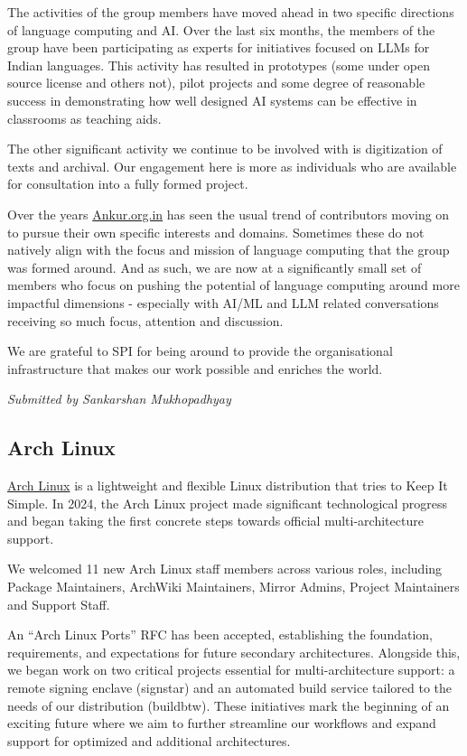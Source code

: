 \documentclass[a4paper]{report}
\begin{document}
The activities of the group members have moved ahead in two specific directions of language computing and AI. Over the last six months, the members of the group have been participating as experts for initiatives focused on LLMs for Indian languages. This activity has resulted in prototypes (some under open source license and others not), pilot projects and some degree of reasonable success in demonstrating how well designed AI systems can be effective in classrooms as teaching aids.

The other significant activity we continue to be involved with is digitization of texts and archival. Our engagement here is more as individuals who are available for consultation into a fully formed project.

Over the years \href{https://ankur.org.in/}{Ankur.org.in} has seen the usual trend of contributors moving on to pursue their own specific interests and domains. Sometimes these do not natively align with the focus and mission of language computing that the group was formed around. And as such, we are now at a significantly small set of members who focus on pushing the potential of language computing around more impactful dimensions - especially with AI/ML and LLM related conversations receiving so much focus, attention and discussion.

We are grateful to SPI for being around to provide the organisational infrastructure that makes our work possible and enriches the world.

{\em Submitted by Sankarshan Mukhopadhyay}

\subsection{Arch Linux}

\href{https://archlinux.org/}{Arch Linux} is a lightweight and flexible Linux distribution that tries to Keep It Simple. In 2024, the Arch Linux project made significant technological progress and began taking the first concrete steps towards official multi-architecture support.

We welcomed 11 new Arch Linux staff members across various roles, including Package Maintainers, ArchWiki Maintainers, Mirror Admins, Project Maintainers and Support Staff.

An “Arch Linux Ports” RFC has been accepted, establishing the foundation, requirements, and expectations for future secondary architectures. Alongside this, we began work on two critical projects essential for multi-architecture support: a remote signing enclave (signstar) and an automated build service tailored to the needs of our distribution (buildbtw). These initiatives mark the beginning of an exciting future where we aim to further streamline our workflows and expand support for optimized and additional architectures.
\end{document}
